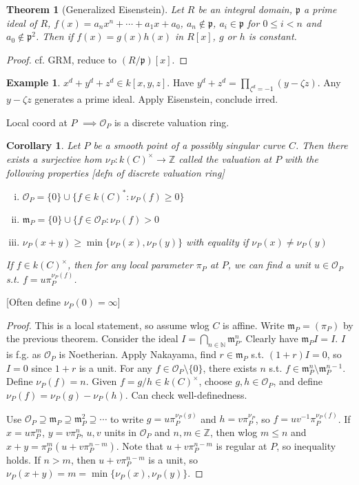 \documentclass{article}
\theoremstyle{definition}
\newtheorem{example}[defn]{Example}
\theoremstyle{remark}
\theoremstyle{plain}
\newtheorem{thm}[defn]{Theorem}
\newtheorem{crly}[defn]{Corollary}
\newcommand{\NN}{\mathbb{N}}
\newcommand{\ZZ}{\mathbb{Z}}
\begin{document}
\begin{thm}[Generalized Eisenstein]
    Let $R$ be an integral domain, $\mathfrak p$ a prime ideal of $R$, $f(x)=a_nx^n+\cdots+a_1x+a_0$, $a_n\notin \mathfrak p$, $a_i\in\mathfrak p$ for $0\le i<n$ and $a_0\notin\mathfrak p^2$. Then if $f(x)=g(x)h(x)$ in $R[x]$, $g$ or $h$ is constant.
\end{thm}
\begin{proof}
    cf. GRM, reduce to $(R/\mathfrak p)[x]$.
\end{proof}
\begin{example}
    $x^d+y^d+z^d\in k[x,y,z]$. Have $y^d+z^d=\prod_{\zeta^d=-1}(y-\zeta z)$. Any $y-\zeta z$ generates a prime ideal. Apply Eisenstein, conclude irred.
\end{example}

Local coord at $P$ $\implies \mathcal O_P$ is a discrete valuation ring.
\begin{crly}
    Let $P$ be a smooth point of a possibly singular curve $C$. Then there exists a surjective hom $\nu_P:k(C)^\times\to \ZZ$ called the valuation at $P$ with the following properties [defn of discrete valuation ring]
    \begin{enumerate}[(i)]
        \item $\mathcal O_P=\{0\}\cup\{f\in k(C)^\ast:\nu_P(f)\ge 0\}$
        \item $\mathfrak m_P=\{0\}\cup\{f\in\mathcal O_P:\nu_P(f)>0$
        \item $\nu_P(x+y)\ge \min\{\nu_P(x),\nu_P(y)\}$ with equality if $\nu_P(x)\neq\nu_P(y)$
    \end{enumerate}

    If $f\in k(C)^\times$, then for any local parameter $\pi_P$ at $P$, we can find a unit $u\in\mathcal O_P$ s.t. $f=u\pi_P^{\nu_P(f)}$.
\end{crly}
[Often define $\nu_P(0)=\infty$]
\begin{proof}
    This is a local statement, so assume wlog $C$ is affine. Write $\mathfrak m_P=(\pi_P)$ by the previous theorem. Consider the ideal $I=\bigcap_{n\in\NN}\mathfrak m_P^n$. Clearly have $\mathfrak m_PI=I$. $I$ is f.g. as $\mathcal O_P$ is Noetherian. Apply Nakayama, find $r\in\mathfrak m_P$ s.t. $(1+r)I=0$, so $I=0$ since $1+r$ is a unit. For any $f\in\mathcal O_P\setminus\{0\}$, there exists $n$ s.t. $f\in\mathfrak m_P^n\setminus\mathfrak m_P^{n-1}$. Define $\nu_P(f)=n$. Given $f=g/h\in k(C)^\times$, choose $g,h\in\mathcal O_P$, and define $\nu_P(f)=\nu_P(g)-\nu_P(h)$. Can check well-definedness. 

    Use $\mathcal O_P\supseteq\mathfrak m_P\supseteq\mathfrak m_P^2\supseteq\cdots$ to write $g=u\pi_P^{\nu_P(g)}$ and $h=v\pi_P^{\nu_P}$, so $f=uv^{-1}\pi_{P}^{\nu_P(f)}$. If $x=u\pi_P^m$, $y=v\pi_P^n$, $u,v$ units in $\mathcal O_P$ and $n,m\in\ZZ$, then wlog $m\le n$ and $x+y=\pi_P^m(u+v\pi_P^{n-m})$. Note that $u+v\pi_P^{n-m}$ is regular at $P$, so inequality holds. If $n>m$, then $u+v\pi_P^{n-m}$ is a unit, so $\nu_P(x+y)=m=\min\{\nu_P(x),\nu_P(y)\}$.
\end{proof}
\end{document}
